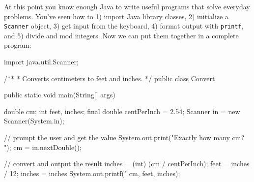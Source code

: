 \documentclass[12pt]{book}
\theoremstyle{exercise}
\newcommand{\java}[1]{\verb"#1"}
\newcommand{\java}[1]{\lstinline{#1}} %
\begin{document}


At this point you know enough Java to write useful programs that solve everyday problems.
You've seen how to 1) import Java library classes, 2) initialize a \java{Scanner} object, 3) get input from the keyboard, 4) format output with \java{printf}, and 5) divide and mod integers.
Now we can put them together in a complete program:


\begin{code}
import java.util.Scanner;

/**
 * Converts centimeters to feet and inches.
 */
public class Convert {
    public static void main(String[] args) {
        double cm;
        int feet, inches;
        final double centPerInch = 2.54;
        Scanner in = new Scanner(System.in);

        // prompt the user and get the value
        System.out.print("Exactly how many cm? ");
        cm = in.nextDouble();

        // convert and output the result
        inches = (int) (cm / centPerInch);
        feet = inches / 12;
        inches = inches %
        System.out.printf("%
                          cm, feet, inches);
    }
}
\end{code}
\end{document}
